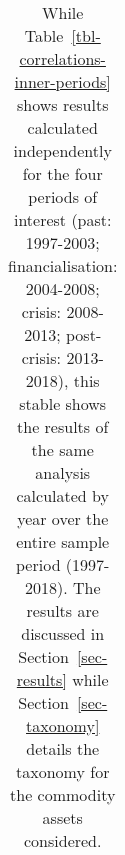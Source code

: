 \documentclass[
  authoryear,
  preprint,
  3p]{elsarticle}
\begin{document}
\begin{landscape}\begingroup\fontsize{7}{9}\selectfont

\begin{longtable}[t]{>{}l>{}l>{}l>{}l>{}r>{}r>{}r>{}r>{}r>{}r>{}r>{}r>{}r>{}r}

\caption{\label{tbl-correlations-inner-years}While
Table~\ref{tbl-correlations-inner-periods} shows results calculated
independently for the four periods of interest (past: 1997-2003;
financialisation: 2004-2008; crisis: 2008-2013; post-crisis: 2013-2018),
this stable shows the results of the same analysis calculated by year
over the entire sample period (1997-2018). The results are discussed in
Section~\ref{sec-results} while Section~\ref{sec-taxonomy} details the
taxonomy for the commodity assets considered.}

\tabularnewline


\end{longtable}
\end{landscape}
\end{document}
